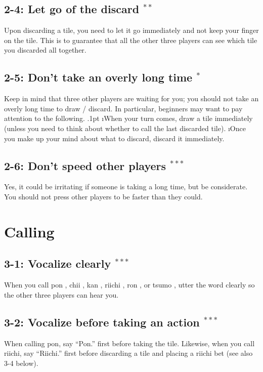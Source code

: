 \subsection*{2-4: Let go of the discard $^{**}$}
Upon discarding a tile, you need to let it go immediately and not keep your finger on the tile. This is to guarantee that all the other three players can see which tile you discarded all together.

\subsection*{2-5: Don't take an overly long time $^{*}$}
Keep in mind that three other players are waiting for you; you should not take an overly long time to draw / discard. In particular, beginners may want to pay attention to the following.
\bi\itemsep.1pt
\i When your turn comes, draw a tile immediately (unless you need to think about whether to call the last discarded tile).
\i Once you make up your mind about what to discard, discard it immediately.
\ei

\subsection*{2-6: Don't speed other players $^{***}$}
Yes, it could be irritating if someone is taking a long time, but be considerate.
You should not press other players to be faster than they could.

\section{Calling}

\subsection*{3-1: Vocalize clearly $^{***}$}
When you call {\jap pon} \textipa{[p\'\textopeno\ng]}, {\jap chii} , {\jap kan} \textipa{[k\'\textturnv\ng]}, riichi , {\jap ron} \textipa{[r\'\textopeno\ng]}, or {\jap tsumo} \textipa{[ts\'umo]}, utter the word clearly so the other three players can hear you.

\subsection*{3-2: Vocalize before taking an action $^{***}$}
When calling {\jap pon}, say ``{\jap Pon}.'' first before taking the tile. Likewise, when you call riichi, say ``{\jap Riichi}.'' first before discarding a tile and placing a riichi bet (see also 3-4 below).

